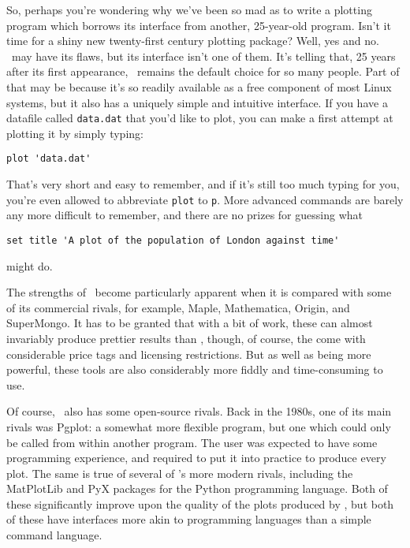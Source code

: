So, perhaps you're wondering why we've been so mad as to write a plotting
program which borrows its interface from another, 25-year-old program. Isn't it
time for a shiny new twenty-first century plotting package? Well, yes and no.
\gnuplot\ may have its flaws, but its interface isn't one of them. It's telling
that, 25 years after its first appearance, \gnuplot\ remains the default choice
for so many people. Part of that may be because it's so readily available as a
free component of most Linux systems, but it also has a uniquely simple and
intuitive interface. If you have a datafile called {\tt data.dat} that you'd
like to plot, you can make a first attempt at plotting it by simply typing:
\begin{verbatim}
plot 'data.dat'
\end{verbatim}
That's very short and easy to remember, and if it's still too much typing for
you, you're even allowed to abbreviate {\tt plot} to {\tt p}. More advanced commands are barely any more difficult to remember, and there are no prizes for guessing what
\begin{verbatim}
set title 'A plot of the population of London against time'
\end{verbatim}
might do.

The strengths of \gnuplot\ become particularly apparent when it is compared
with some of its commercial rivals, for example, {\sc Maple}, {\sc
Mathematica}, {\sc Origin}, and {\sc
SuperMongo}. It has to be granted that with a bit of work,
these can almost invariably produce prettier results than \gnuplot, though, of
course, the come with considerable price tags and licensing restrictions. But
as well as being more powerful, these tools are also considerably more fiddly
and time-consuming to use.

Of course, \gnuplot\ also has some open-source rivals. Back in the 1980s, one
of its main rivals was {\sc Pgplot}: a somewhat more flexible
program, but one which could only be called from within another program. The
user was expected to have some programming experience, and required to put it
into practice to produce every plot. The same is true of several of \gnuplot's
more modern rivals, including the {\sc MatPlotLib} and {\sc
PyX} packages for the Python programming language. Both of these
significantly improve upon the quality of the plots produced by \gnuplot, but
both of these have interfaces more akin to programming languages than a simple
command language.

